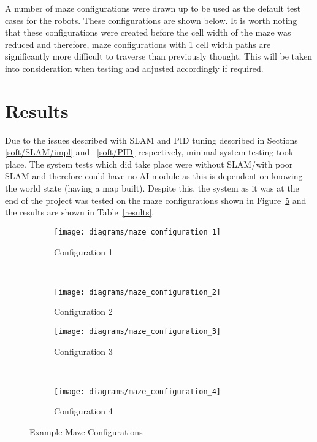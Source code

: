 A number of maze configurations were drawn up to be used as the default test
cases for the robots. These configurations are shown below.  It is worth noting that these configurations were created before the
cell width of the maze was reduced and therefore, maze configurations with 1
cell width paths are significantly more difficult to traverse than previously
thought. This will be taken into consideration when testing and adjusted
accordingly if required.


\section{Results}\label{systest/results}
Due to the issues described with SLAM and PID tuning described in Sections~
\ref{soft/SLAM/impl} and ~\ref{soft/PID} respectively,
minimal system testing took place. The system tests which did take place were
without SLAM/with poor SLAM and therefore could have no AI module as this is
dependent on knowing the world state (having a map built). Despite this, the
system as it was at the end of the project was tested on the maze configurations shown in Figure~\ref{fig:maze_configs}
and the results are shown in Table~\ref{results}.

\begin{figure}[!ht]
  \centering
  \begin{subfigure}[b]{0.3\textwidth}
    \texttt{[image: diagrams/maze\_configuration\_1]}
    \caption{Configuration 1}
    \label{fig:maze_configs/1}
  \end{subfigure}
  ~
  \begin{subfigure}[b]{0.3\textwidth}
    \texttt{[image: diagrams/maze\_configuration\_2]}
    \caption{Configuration 2}
    \label{fig:maze_configs/2}
  \end{subfigure}

  \begin{subfigure}[b]{0.3\textwidth}
    \texttt{[image: diagrams/maze\_configuration\_3]}
    \caption{Configuration 3}
    \label{fig:maze_configs/3}
  \end{subfigure}
  ~
  \begin{subfigure}[b]{0.3\textwidth}
    \texttt{[image: diagrams/maze\_configuration\_4]}
    \caption{Configuration 4}
    \label{fig:maze_configs/4}
  \end{subfigure}
  \caption{Example Maze Configurations}\label{fig:maze_configs}
\end{figure}

